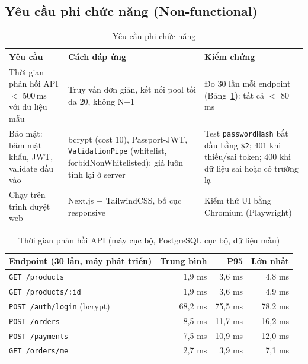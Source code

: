 \documentclass[a4paper]{article}
\begin{document}
\subsection{Yêu cầu phi chức năng (Non-functional)}
\begin{table}[h!]
\centering
\begin{tabularx}{\textwidth}{|L{3cm}|L{4.2cm}|X|}
\hline
\textbf{Yêu cầu} & \textbf{Cách đáp ứng} & \textbf{Kiểm chứng} \\ \hline
Thời gian phản hồi API $<$ 500\,ms với dữ liệu mẫu & Truy vấn đơn giản, kết nối pool tối đa 20, không N+1 & Đo 30 lần mỗi endpoint (Bảng~\ref{tab:perf}): tất cả $<$ 80\,ms \\ \hline
Bảo mật: băm mật khẩu, JWT, validate đầu vào & bcrypt (cost 10), Passport-JWT, \texttt{ValidationPipe} (whitelist, forbidNonWhitelisted); giá luôn tính lại ở server & Test \texttt{passwordHash} bắt đầu bằng \texttt{\$2}; 401 khi thiếu/sai token; 400 khi dữ liệu sai hoặc có trường lạ \\ \hline
Chạy trên trình duyệt web & Next.js + TailwindCSS, bố cục responsive & Kiểm thử UI bằng Chromium (Playwright) \\ \hline
\end{tabularx}
\caption{Yêu cầu phi chức năng}
\end{table}

\begin{table}[h!]
\centering\small
\begin{tabular}{|l|r|r|r|}
\hline
\textbf{Endpoint (30 lần, máy phát triển)} & \textbf{Trung bình} & \textbf{P95} & \textbf{Lớn nhất} \\ \hline
\texttt{GET /products} & 1,9 ms & 3,6 ms & 4,8 ms \\ \hline
\texttt{GET /products/:id} & 1,9 ms & 3,6 ms & 4,9 ms \\ \hline
\texttt{POST /auth/login} (bcrypt) & 68,2 ms & 75,5 ms & 78,2 ms \\ \hline
\texttt{POST /orders} & 8,5 ms & 11,7 ms & 16,2 ms \\ \hline
\texttt{POST /payments} & 7,5 ms & 10,9 ms & 12,0 ms \\ \hline
\texttt{GET /orders/me} & 2,7 ms & 3,9 ms & 7,1 ms \\ \hline
\end{tabular}
\caption{Thời gian phản hồi API (máy cục bộ, PostgreSQL cục bộ, dữ liệu mẫu)}\label{tab:perf}
\end{table}
\end{document}
